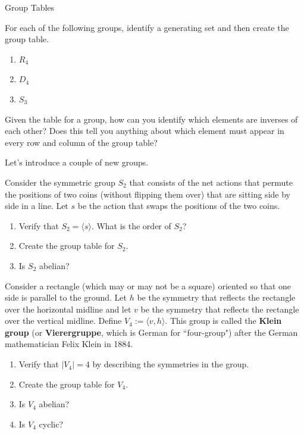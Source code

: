 \begin{section}{Group Tables}
\begin{problem}
For each of the following groups, identify a generating set and then create the group table.
\begin{enumerate}[label=\rm{(\alph*)}]
\item $R_4$
\item $D_4$
\item $S_3$
\end{enumerate}
\end{problem}

\begin{problem}
Given the table for a group, how can you identify which elements are inverses of each other?  Does this tell you anything about which element must appear in every row and column of the group table?
\end{problem}

Let's introduce a couple of new groups.

\begin{problem}\label{prob:introducing_S2}
Consider the symmetric group $S_2$ that consists of the net actions that permute the positions of two coins (without flipping them over) that are sitting side by side in a line.  Let $s$ be the action that swaps the positions of the two coins.
\begin{enumerate}[label=\rm{(\alph*)}]
\item Verify that $S_2=\langle s\rangle$. What is the order of $S_2$?
\item Create the group table for $S_2$.
\item Is $S_2$ abelian?
\end{enumerate}
\end{problem}

\begin{problem}\label{prob:introducing_V4}
Consider a rectangle (which may or may not be a square) oriented so that one side is parallel to the ground.  Let $h$ be the symmetry that reflects the rectangle over the horizontal midline and let $v$ be the symmetry that reflects the rectangle over the vertical midline. Define $V_4:=\langle v, h\rangle$. This group is called the \textbf{Klein group} (or \textbf{Vierergruppe}, which is German for ``four-group") after the German mathematician Felix Klein in 1884.
\begin{enumerate}[label=\rm{(\alph*)}]
\item Verify that $|V_4|=4$ by describing the symmetries in the group.
\item Create the group table for $V_4$.
\item Is $V_4$ abelian?
\item Is $V_4$ cyclic?
\end{enumerate}
\end{problem}


\end{section}
